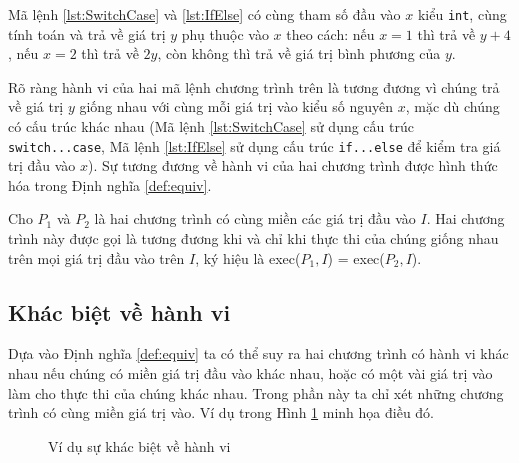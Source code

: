 \begin{minipage}[t]{0.45\linewidth}
  
\end{minipage}%
\hfill\vrule\hfill
\begin{minipage}[t]{0.45\linewidth}
  
\end{minipage}%

Mã lệnh \ref{lst:SwitchCase} và \ref{lst:IfElse} có cùng tham số đầu vào
$ x $ kiểu \texttt{int}, cùng tính toán và trả về giá trị
$ y $ phụ thuộc vào $ x $ theo cách: nếu $ x = 1 $ thì
trả về $ y + 4 $, nếu $ x = 2 $ thì trả về $ 2y $, còn
không thì trả về giá trị bình phương của $ y $.

Rõ ràng hành vi của hai mã lệnh chương trình trên là tương đương vì
chúng trả về giá trị $ y $ giống nhau với cùng mỗi giá trị vào
kiểu số nguyên $ x $, mặc dù chúng có cấu trúc khác nhau (Mã lệnh
\ref{lst:SwitchCase} sử dụng cấu trúc \texttt{switch...case}, Mã lệnh
\ref{lst:IfElse} sử dụng cấu trúc \texttt{if...else} để kiểm tra giá
trị đầu vào $x$). Sự tương đương về hành vi của hai chương trình được
hình thức hóa trong Định nghĩa \ref{def:equiv}.

\begin{definition}
  \label{def:equiv}
  Cho $P_{1}$ và $P_{2}$ là hai chương trình có cùng miền các giá trị
  đầu vào $I$. Hai chương trình này được gọi là tương đương khi và chỉ
  khi thực thi của chúng giống nhau trên mọi giá trị đầu vào trên $I$,
  ký hiệu là exec($P_{1}, I$) = exec($P_{2}, I$).
\end{definition}
	
\subsection{Khác biệt về hành vi}

Dựa vào Định nghĩa \ref{def:equiv} ta có thể suy ra hai chương trình
có hành vi khác nhau nếu chúng có miền giá trị đầu vào khác nhau, hoặc
có một vài giá trị vào làm cho thực thi của chúng khác nhau. Trong
phần này ta chỉ xét những chương trình có cùng miền giá trị vào. 
Ví dụ trong Hình \ref{fig:behavioral-diff} minh họa điều đó.

\begin{figure}[h]
  \centering
  \caption{Ví dụ sự khác biệt về hành vi}
  \label{fig:behavioral-diff}
  \begin{minipage}[t]{0.45\linewidth}
    
  \end{minipage}%
\hfill\vrule\hfill
\begin{minipage}[t]{0.45\linewidth}
  
\end{minipage}%
\end{figure}

